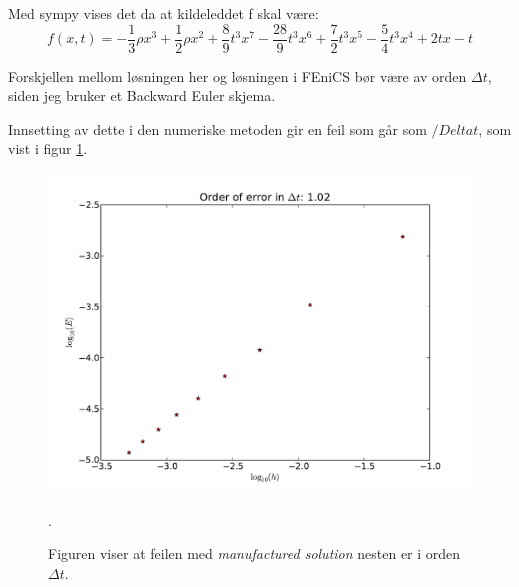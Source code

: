 \documentclass[a4paper, 10pt]{article}
\begin{document}
Med sympy vises det da at kildeleddet f skal være:
\begin{equation}
	f(x, t) = - \frac{1}{3} \rho x^{3} + \frac{1}{2} \rho x^{2} + \frac{8}{9} t^{3} x^{7} - \frac{28}{9} t^{3} x^{6} + \frac{7}{2} t^{3} x^{5} - \frac{5}{4} t^{3} x^{4} + 2 t x - t
\end{equation}

Forskjellen mellom løsningen her og løsningen i FEniCS bør være av orden $\Delta t$, siden jeg bruker et Backward Euler skjema. 

Innsetting av dette i den numeriske metoden gir en feil som går som $/Delta t$, som vist i figur \ref{fig:convergence_manufactured_1d}.

\begin{figure}
\includegraphics[width=\textwidth]{figures/convergence_manufactured_1d.pdf}
\caption{Figuren viser at feilen med \emph{manufactured solution} nesten er i orden $\Delta t$.}
\label{fig:convergence_manufactured_1d}.
\end{figure}
\end{document}
